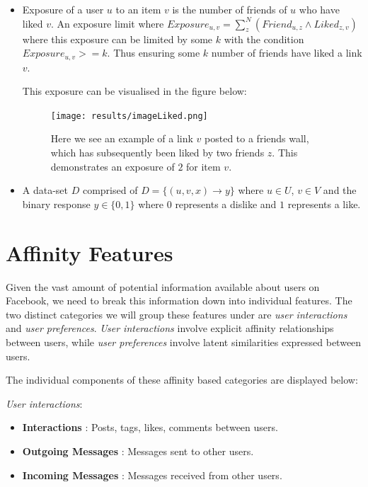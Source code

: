 \begin{itemize}
\item  Exposure of a user $u$
to an item $v$ is the number of friends of $u$ who have liked $v$. An exposure limit where $Exposure_{u,v} = \displaystyle\sum_{z}^{N} (Friend_{u,z} \wedge Liked_{z,v})$ where this exposure can be 
limited by some $k$ with the condition $Exposure_{u,v} >= k$. Thus ensuring some $k$ number of friends have liked a link $v$.

This exposure can be visualised in the figure below:

\begin{figure}[tbh!]
	\begin{center}
		\texttt{[image: results/imageLiked.png]}
		\caption{Here we see an example of a link $v$ posted to a friends wall, which has subsequently been liked by two friends $z$. This 
				 demonstrates an exposure of $2$ for item $v$.}
	\end{center}
\end{figure}

\item A data-set $D$ comprised of $D = \{(u,v,x) \to y\}$ where $u \in U$, $v \in V$ and the binary response $y \in \{0,1\}$ 
where $0$ represents a dislike and $1$ represents a like. 
\end{itemize}

\section{Affinity Features}
\label{sec:features}

Given the vast amount of potential information available about users on Facebook, we need to break this information down into individual 
features. The two distinct categories we will group these features under are \emph{user interactions} and \emph{user preferences}. 
\emph{User interactions} involve explicit affinity relationships between users, while \emph{user preferences} involve latent 
similarities expressed between users.

The individual components of these affinity based categories are displayed below:

\emph{User interactions}:
\begin{itemize}
\item \textbf{Interactions} : Posts, tags, likes, comments between users.
\item \textbf{Outgoing Messages} : Messages sent to other users.
\item \textbf{Incoming Messages} : Messages received from other users.
\end{itemize}

